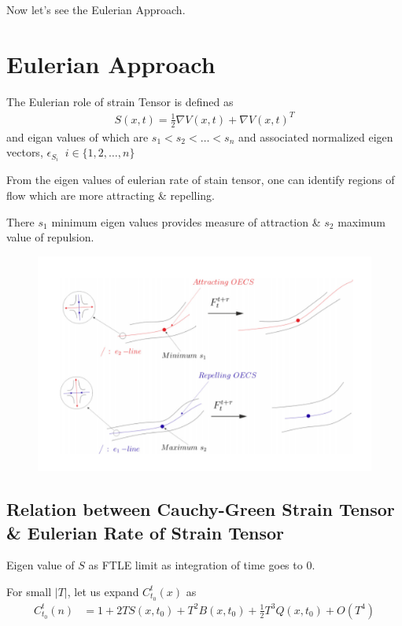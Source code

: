 \documentclass[../report.tex]{subfiles}
\begin{document}
Now let's see the Eulerian Approach. \par

\section{Eulerian Approach}

The Eulerian role of strain Tensor is defined as
\begin{equation}
  \begin{aligned}
    S(x, t) = \frac{1}{2}{\nabla V(x, t) + \nabla V(x, t)^T}
  \end{aligned}
\end{equation}
and eigan values of which are \(s_1 < s_2 < \dots < s_n\) and associated normalized eigen vectors, \(\epsilon_{S_i}\;\; i \in \{1, 2, \dots, n\}\) \par

From the eigen values of eulerian rate of stain tensor, one can identify regions of flow which are more attracting \& repelling. \par

There \(s_1\) \rightarrow minimum eigen values provides measure of attraction \& \(s_2\) maximum value of repulsion.

\begin{figure}[H]
  \centering
  \includegraphics[width=0.6\linewidth]{images/figure4.png}
  \caption{}
\end{figure}

\subsection{Relation between Cauchy-Green Strain Tensor \& Eulerian Rate of Strain Tensor}
Eigen value of \(S\) as FTLE limit as integration of time goes to 0. \par

For small \(|T|\), let us expand  \(C_{t_0}^t (x)\) as
\begin{equation}
  \begin{aligned}
    C_{t_0}^t (n) &= 1 + 2T S(x, t_0) + T^2 B(x, t_0) + \frac{1}{2} T^3 Q(x, t_0) + O(T^4)
  \end{aligned}
\end{equation}
\end{document}
